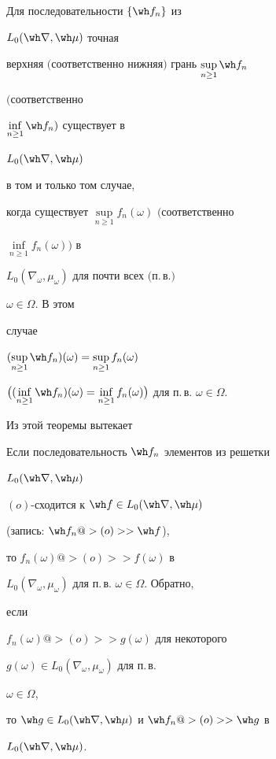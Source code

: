 \begin{thm} 


Для последовательности $\{\wh f_n\}$ из 


$L_0(\wh\nabla,\wh\mu)$ точная 


верхняя $($соответственно нижняя$)$ грань $\sup\limits_{n\ge1}\wh f_n$ 


$($соответственно 


$\inf\limits_{n\ge1}\wh f_n)$ существует в 


$L_0(\wh\nabla,\wh\mu)$ 


в том и только том случае, 


когда существует $\sup\limits_{n\ge1}f_n(\omega)$ $($соответственно 


$\inf\limits_{n\ge1}f_n(\omega))$ в 


$L_0(\nabla_\omega,\mu_\omega)$ для почти всех $($п.\,в.$)$


$\omega\in\Omega$. В этом 


случае 


$(\sup\limits_{n\ge1}\wh f_n)(\omega)= 


\sup\limits_{n\ge1}f_n(\omega)$ 


$\big((\inf\limits_{n\ge1}\wh f_n)(\omega)= 


\inf\limits_{n\ge1}f_n(\omega)\big)$ для п.\,в. $\omega\in\Omega$. 


\end{thm} 


 


Из этой теоремы вытекает 


 


\begin{cornonum} 


Если последовательность $\wh f_n$ элементов из решетки 


$L_0(\wh\nabla,\wh\mu)$\; 


$(o)$-сходится к $\wh f\in L_0(\wh\nabla,\wh\mu)$ 


(запись: $\wh f_n@>(o)>>\wh f$), 


то $f_n(\omega)@>(o)>> f(\omega)$ в 


$L_0(\nabla_\omega,\mu_\omega)$ для п.\,в. $\omega\in\Omega$. Обратно, 


если 


$f_n(\omega)@>(o)>> g(\omega)$ для некоторого 


$g(\omega)\in L_0(\nabla_\omega,\mu_\omega)$ для п.\,в. 


$\omega\in\Omega$, 


то $\wh g\in L_0(\wh\nabla,\wh\mu)$ и $\wh f_n@>(o)>>\wh g$ в 


$L_0(\wh\nabla,\wh\mu)$. 


\end{cornonum} 


